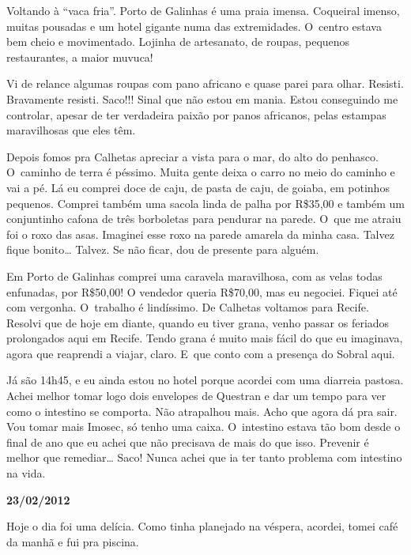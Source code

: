 Voltando à ``vaca fria''. Porto de Galinhas é uma praia imensa.
Coqueiral imenso, muitas pousadas e um hotel gigante numa das
extremidades. O~centro estava bem cheio e movimentado. Lojinha de
artesanato, de roupas, pequenos restaurantes, a maior muvuca!

Vi de relance algumas roupas com pano africano e quase parei para olhar.
Resisti. Bravamente resisti. Saco!!! Sinal que não estou em mania. Estou
conseguindo me controlar, apesar de ter verdadeira paixão por panos
africanos, pelas estampas maravilhosas que eles têm.

Depois fomos pra Calhetas apreciar a vista para o mar, do alto do
penhasco. O~caminho de terra é péssimo. Muita gente deixa o carro no
meio do caminho e vai a pé. Lá eu comprei doce de caju, de pasta de
caju, de goiaba, em potinhos pequenos. Comprei também uma sacola linda
de palha por R\$35,00 e também um conjuntinho cafona de três borboletas
para pendurar na parede. O~que me atraiu foi o roxo das asas. Imaginei
esse roxo na parede amarela da minha casa. Talvez fique bonito…
Talvez. Se não ficar, dou de presente para alguém.

Em Porto de Galinhas comprei uma caravela maravilhosa, com as velas
todas enfunadas, por R\$50,00! O vendedor queria R\$70,00, mas eu
negociei. Fiquei até com vergonha. O~trabalho é lindíssimo. De Calhetas
voltamos para Recife. Resolvi que de hoje em diante, quando eu tiver
grana, venho passar os feriados prolongados aqui em Recife. Tendo grana
é muito mais fácil do que eu imaginava, agora que reaprendi a viajar,
claro. E~que conto com a presença do Sobral aqui.

Já são 14h45, e eu ainda estou no hotel porque acordei com uma diarreia
pastosa. Achei melhor tomar logo dois envelopes de Questran e dar um
tempo para ver como o intestino se comporta. Não atrapalhou mais. Acho
que agora dá pra sair. Vou tomar mais Imosec, só tenho uma caixa. O~intestino estava tão bom desde o final de ano que eu achei que não
precisava de mais do que isso. Prevenir é melhor que remediar…
Saco! Nunca achei que ia ter tanto problema com intestino na vida.

\begin{center}\asterisc{}\end{center}

\begin{flushright}\textbf{23/02/2012}\end{flushright}


Hoje o dia foi uma delícia. Como tinha planejado na véspera, acordei,
tomei café da manhã e fui pra piscina.

